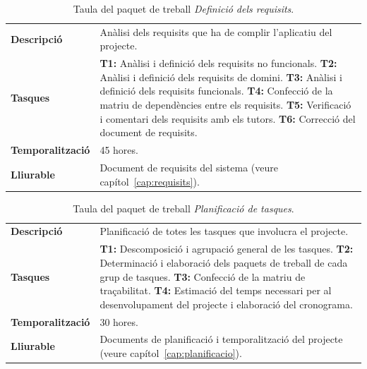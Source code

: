 \documentclass[a4paper,12pt]{ThesisStyle}
\begin{document}
\begin{table}[H]
  \begin{tabularx}{\textwidth}{l | X}
    \toprule
    \rowcolor{Gray}
    \multicolumn{2}{c}{\texttt{\textbf{PT\_1.1:}} Definició dels requisits}\\
    \midrule[0.9pt]
    \textbf{Descripció}       & Anàlisi dels requisits que ha de complir l'aplicatiu del projecte.\\
    \midrule
    \textbf{Tasques}          & \textbf{T1:} Anàlisi i definició dels requisits no funcionals.
    \newline \textbf{T2:} Anàlisi i definició dels requisits de domini.
    \newline \textbf{T3:} Anàlisi i definició dels requisits funcionals.
    \newline \textbf{T4:} Confecció de la matriu de dependències entre els requisits.
    \newline \textbf{T5:} Verificació i comentari dels requisits amb els tutors.
    \newline \textbf{T6:} Correcció del document de requisits.\\
    \midrule
    \textbf{Temporalització}  & 45 hores.\\
    \midrule
    \textbf{Lliurable}        & Document de requisits del sistema (veure capítol~\ref{cap:requisits}).\\
    \bottomrule
  \end{tabularx}
  \caption{\label{taula:pt_1.1} Taula del paquet de treball \emph{Definició dels requisits}.}
\end{table}

\begin{table}[H]
  \begin{tabularx}{\textwidth}{l | X}
    \toprule
    \rowcolor{Gray}
    \multicolumn{2}{c}{\texttt{\textbf{PT\_1.2:}} Planificació de tasques}\\
    \midrule[0.9pt]
    \textbf{Descripció}       & Planificació de totes les tasques que involucra el projecte.\\
    \midrule
    \textbf{Tasques}          & \textbf{T1:} Descomposició i agrupació general de les tasques.
    \newline \textbf{T2:} Determinació i elaboració dels paquets de treball de cada grup de tasques.
    \newline \textbf{T3:} Confecció de la matriu de traçabilitat.
    \newline \textbf{T4:} Estimació del temps necessari per al desenvolupament del projecte i elaboració del cronograma.\\
    \midrule
    \textbf{Temporalització}  & 30 hores.\\
    \midrule
    \textbf{Lliurable}        & Documents de planificació i temporalització del projecte (veure capítol~\ref{cap:planificacio}).\\
    \bottomrule
  \end{tabularx}
  \caption{\label{taula:pt_1.2} Taula del paquet de treball \emph{Planificació de tasques}.}
\end{table}
\end{document}
